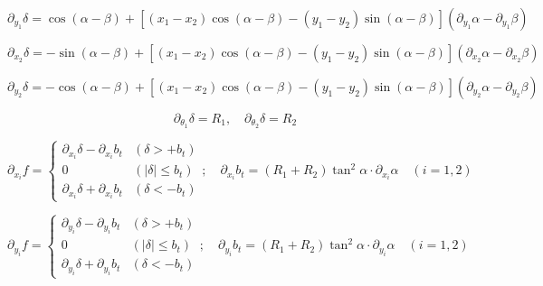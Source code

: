 \begin{equation}
	\partial_{y_1}\delta = \cos(\alpha - \beta) + [(x_1 - x_2) \cos(\alpha - \beta) - (y_1 - y_2) \sin(\alpha - \beta)](\partial_{y_1}\alpha - \partial_{y_1}\beta)
	\label{eq:delta_y1}
\end{equation}

\begin{equation}
	\partial_{x_2}\delta = -\sin(\alpha - \beta) + [(x_1 - x_2) \cos(\alpha - \beta) - (y_1 - y_2) \sin(\alpha - \beta)](\partial_{x_2}\alpha - \partial_{x_2}\beta)
	\label{eq:delta_x2}
\end{equation}

\begin{equation}
	\partial_{y_2}\delta = -\cos(\alpha - \beta) + [(x_1 - x_2) \cos(\alpha - \beta) - (y_1 - y_2) \sin(\alpha - \beta)](\partial_{y_2}\alpha - \partial_{y_2}\beta)
	\label{eq:delta_y2}
\end{equation}

\begin{equation}
	\partial_{\theta_1}\delta = R_1, \quad \partial_{\theta_2}\delta = R_2
	\label{eq:delta_theta}
\end{equation}

\begin{equation}
	\partial_{x_i}f = \begin{cases} 
		\partial_{x_i}\delta - \partial_{x_i}b_t & (\delta > +b_t) \\
		0 & (|\delta| \le b_t) \\
		\partial_{x_i}\delta + \partial_{x_i}b_t & (\delta < -b_t)
	\end{cases} ; \quad \partial_{x_i}b_t = (R_1 + R_2) \tan^2 \alpha \cdot \partial_{x_i}\alpha \quad (i = 1, 2)
	\label{eq:f_xi}
\end{equation}

\begin{equation}
	\partial_{y_i}f = \begin{cases} 
		\partial_{y_i}\delta - \partial_{y_i}b_t & (\delta > +b_t) \\
		0 & (|\delta| \le b_t) \\
		\partial_{y_i}\delta + \partial_{y_i}b_t & (\delta < -b_t)
	\end{cases} ; \quad \partial_{y_i}b_t = (R_1 + R_2) \tan^2 \alpha \cdot \partial_{y_i}\alpha \quad (i = 1, 2)
	\label{eq:f_yi}
\end{equation}

